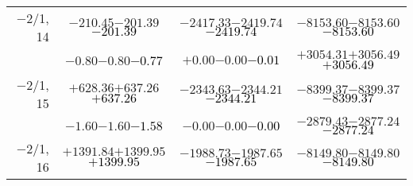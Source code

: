 \documentclass[compress]{beamer}
\begin{document}
\begin{frame}
{\begin{tabular}{r | c | c | c}
$-$2/1, 14 & $-210.45$\hspace{0.1 cm}$-201.39$\hspace{0.1 cm}\textcolor{black}{$-201.39$} & $-2417.33$\hspace{0.1 cm}$-2419.74$\hspace{0.1 cm}\textcolor{black}{$-2419.74$} & $-8153.60$\hspace{0.1 cm}$-8153.60$\hspace{0.1 cm}\textcolor{black}{$-8153.60$} \\
           & $-0.80$\hspace{0.1 cm}$-0.80$\hspace{0.1 cm}\textcolor{black}{$-0.77$} & $+0.00$\hspace{0.1 cm}$-0.00$\hspace{0.1 cm}\textcolor{black}{$-0.01$} & $+3054.31$\hspace{0.1 cm}$+3056.49$\hspace{0.1 cm}\textcolor{black}{$+3056.49$} \\
$-$2/1, 15 & $+628.36$\hspace{0.1 cm}$+637.26$\hspace{0.1 cm}\textcolor{black}{$+637.26$} & $-2343.63$\hspace{0.1 cm}$-2344.21$\hspace{0.1 cm}\textcolor{black}{$-2344.21$} & $-8399.37$\hspace{0.1 cm}$-8399.37$\hspace{0.1 cm}\textcolor{black}{$-8399.37$} \\
           & $-1.60$\hspace{0.1 cm}$-1.60$\hspace{0.1 cm}\textcolor{black}{$-1.58$} & $-0.00$\hspace{0.1 cm}$-0.00$\hspace{0.1 cm}\textcolor{black}{$-0.00$} & $-2879.43$\hspace{0.1 cm}$-2877.24$\hspace{0.1 cm}\textcolor{black}{$-2877.24$} \\
$-$2/1, 16 & $+1391.84$\hspace{0.1 cm}$+1399.95$\hspace{0.1 cm}\textcolor{black}{$+1399.95$} & $-1988.73$\hspace{0.1 cm}$-1987.65$\hspace{0.1 cm}\textcolor{black}{$-1987.65$} & $-8149.80$\hspace{0.1 cm}$-8149.80$\hspace{0.1 cm}\textcolor{black}{$-8149.80$} \\

\end{tabular}}
\end{frame}
\end{document}
